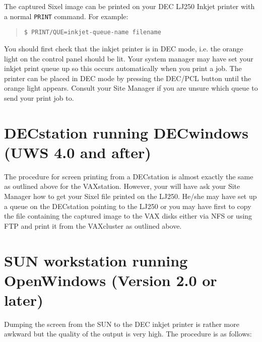 The captured Sixel image can be printed on your DEC LJ250 Inkjet printer with
a normal {\tt PRINT} command. For example:

\begin{quote}

{\tt \$ PRINT/QUE=inkjet-queue-name filename}

\end{quote}

You should first check that the inkjet printer is in DEC mode, i.e. the orange
light on the control panel should be lit. Your system manager may have set your
inkjet print queue up so this occurs automatically when you print a job. The
printer can be placed in DEC mode by pressing the DEC/PCL button until the
orange light appears. Consult your Site Manager if you are unsure which
queue to send your print job to.

\section{DECstation running DECwindows (UWS 4.0 and after)}

The procedure for screen printing from a DECstation is almost exactly the same
as outlined above for the VAXstation. However, your will have ask your Site
Manager how to get your Sixel file printed on the LJ250. He/she may have
set up a queue on the DECstation pointing to the LJ250 or you may have
first to copy the file containing the captured image to the VAX disks either
via NFS or using FTP and print it from the VAXcluster as outlined above.

\section{SUN workstation running OpenWindows (Version 2.0 or later)}

Dumping the screen from the SUN to the DEC inkjet printer is rather more
awkward but the  quality of the output is very high. The procedure is as
follows:

